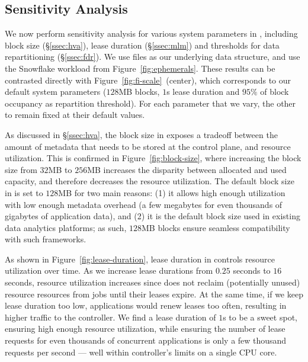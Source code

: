 \subsection{Sensitivity Analysis}
\label{ssec:jiffysensitivity}

We now perform sensitivity analysis for various system parameters in \jiffy, including block size (\S\ref{ssec:hva}), lease duration (\S\ref{ssec:mlm}) and thresholds for data repartitioning (\S\ref{ssec:fdr}). We use files as our underlying data structure, and use the Snowflake workload from Figure~\ref{fig:ephemerals}. These results can be contrasted directly with Figure~\ref{fig:fi-scale}~(center), which corresponds to our default system parameters ($128$MB blocks, $1$s lease duration and $95\%$ of block occupancy as repartition threshold). For each parameter that we vary, the other to remain fixed at their default values.

 As discussed in \S\ref{ssec:hva}, the block size in \jiffy exposes a tradeoff between the amount of metadata that needs to be stored at the control plane, and resource utilization. This is confirmed in Figure~\ref{fig:block-size}, where increasing the block size from $32$MB to $256$MB increases the disparity between allocated and used capacity, and therefore decreases the resource utilization. The default block size in \jiffy is set to $128$MB for two main reasons: (1) it allows high enough utilization with low enough metadata overhead (a few megabytes for even thousands of gigabytes of application data), and (2) it is the default block size used in existing data analytics platforms; as such, $128$MB blocks ensure seamless compatibility with such frameworks.

 As shown in Figure~\ref{fig:lease-duration}, lease duration in \jiffy controls resource utilization over time. As we increase lease durations from $0.25$ seconds to $16$ seconds, resource utilization increases since \jiffy does not reclaim (potentially unused) resource resources from jobs until their leases expire. At the same time, if we keep lease duration too low, applications would renew leases too often, resulting in higher traffic to the \jiffy controller. We find a lease duration of $1$s to be a sweet spot, ensuring high enough resource utilization, while ensuring the number of lease requests for even thousands of concurrent applications is only a few thousand requests per second --- well within \jiffy controller's limits on a single CPU core.

